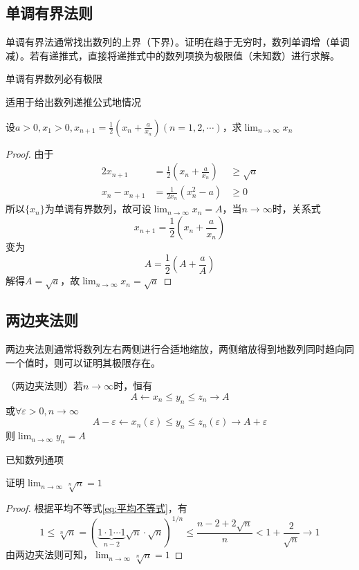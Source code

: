 \pagebreak
\subsection{单调有界法则}
单调有界法通常找出数列的上界（下界）。证明在趋于无穷时，数列单调增（单调减）。若有递推式，直接将递推式中的数列项换为极限值（未知数）进行求解。
\begin{theorem}
    \label{th:单调有界法则}
    单调有界数列必有极限
\end{theorem}
\begin{situation}
    适用于给出数列递推公式地情况
\end{situation}
\begin{example}
    设$a>0, x_1 > 0, x_{n+1} = \frac{1}{2}(x_n+\frac{a}{x_n}) (n=1,2,\cdots)$，求$\lim_{n\to\infty}x_n$
\end{example}
\begin{proof}
    由于
    \begin{alignat*}{2}
        x_{n+1}         & = \frac{1}{2}(x_n+\frac{a}{x_n}) & \geq  \sqrt{a} \\
        x_{n} - x_{n+1} & = \frac{1}{2x_n}(x_n^2-a)        & \geq  0
    \end{alignat*}
    所以$\{x_n\}$为单调有界数列，故可设$\lim_{n\to\infty} x_n = A$，当$n\to\infty$时，关系式
    \[ x_{n+1} = \frac{1}{2}(x_n+\frac{a}{x_n}) \]
    变为
    \[ A = \frac{1}{2}(A+\frac{a}{A}) \]
    解得$A=\sqrt{a}$，故$\lim_{n\to\infty} x_n =\sqrt{a}$
\end{proof}

\subsection{两边夹法则}
两边夹法则通常将数列左右两侧进行合适地缩放，两侧缩放得到地数列同时趋向同一个值时，则可以证明其极限存在。
\begin{theorem}
    \label{th:两边夹法则}
    （两边夹法则）若$n\to\infty$时，恒有
    \[ A \leftarrow x_n \leq y_n \leq z_n \rightarrow A \]
    或$\forall \varepsilon > 0, n\to\infty$
    \[ A -\varepsilon \leftarrow x_n(\varepsilon) \leq y_n \leq z_n(\varepsilon) \rightarrow A + \varepsilon \]
    则$\lim_{n \to\infty} y_n=A$
\end{theorem}
\begin{situation}
    已知数列通项
\end{situation}
\begin{example}
    证明$\lim_{n\to\infty}\sqrt[n]{n} = 1$
\end{example}
\begin{proof}
    根据平均不等式\ref{eq:平均不等式}，有
    \[ 1 \leq \sqrt[n]{n} = (\underbrace{1\cdot 1\cdots 1}_{n-2}\sqrt{n}\cdot\sqrt{n})^{1/n}\leq \frac{n-2+2\sqrt{n}}{n} < 1+\frac{2}{\sqrt{n}} \to 1 \]
    由两边夹法则可知，$\lim_{n\to\infty}\sqrt[n]{n} = 1$
\end{proof}

